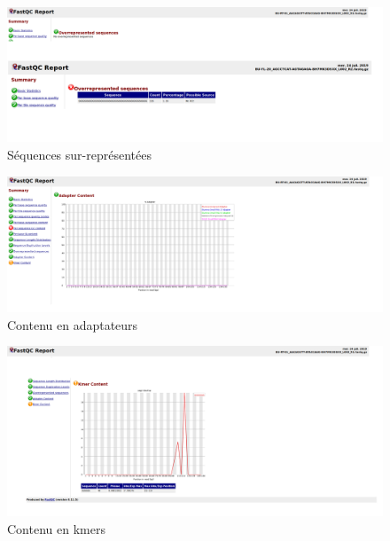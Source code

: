 \documentclass[a4paper,11pt]{article}
\begin{document}
\begin{figure}
  \begin{center}
    \includegraphics[width=16cm]{Images/FastqcMetrics9_Sample1_R1}
  \end{center}
  \caption{Séquences sur-représentées}
  \label{fig-FastqcMetrics1_Sample9_R1}
\end{figure}

\begin{figure}
  \begin{center}
    \includegraphics[width=16cm]{Images/FastqcMetrics10_Sample1_R1}
  \end{center}
  \caption{Contenu en adaptateurs}
  \label{fig-FastqcMetrics1_Sample10_R1}
\end{figure}

\begin{figure}
  \begin{center}
    \includegraphics[width=16cm]{Images/FastqcMetrics11_Sample1_R1}
  \end{center}
  \caption{Contenu en kmers}
  \label{fig-FastqcMetrics1_Sample11_R1}
\end{figure}
\end{document}
